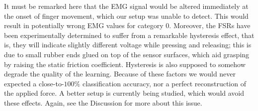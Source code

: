 It must be remarked here that the EMG signal would be altered
immediately at the onset of finger movement, which our setup was
unable to detect. This would result in potentially wrong EMG values for
category $0$. Moreover, the FSRs have been experimentally determined
to suffer from a remarkable hysteresis effect, that is, they will
indicate slightly different voltage while pressing and releasing; this
is due to small rubber ends glued on top of the sensor surfaces, which
aid grasping by raising the static friction coefficient. Hysteresis is
also supposed to somehow degrade the quality of the learning. Because
of these factors we would never expected a close-to-$100\%$
classification accuracy, nor a perfect reconstruction of the applied
force. A better setup is currently being studied, which would avoid
these effects. Again, see the Discussion for more about this issue.
